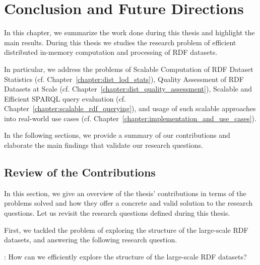 \chapter{Conclusion and Future Directions}
\label{chapter:conclusion}
In this chapter, we summarize the work done during this thesis and highlight the main results.
During this thesis we studies the research problem of efficient distributed in-memory computation and processing of RDF datasets.

In particular, we address the problems of Scalable Computation of RDF Dataset Statistics (cf. Chapter~\ref{chapter:dist_lod_stats}), Quality Assessment of RDF Datasets at Scale (cf. Chapter~\ref{chapter:dist_quality_assessment}), Scalable and Efficient SPARQL query evaluation (cf. Chapter~\ref{chapter:scalable_rdf_querying}), and usage of such scalable approaches into real-world use cases (cf. Chapter~\ref{chapter:implementation_and_use_cases}).

In the following sections, we provide a summary of our contributions and elaborate the main findings that validate our research questions.

\section{Review of the Contributions}
In this section, we give an overview of the thesis' contributions in terms of the problems solved and how they offer a concrete and valid solution to the research questions.
Let us revisit the research questions defined during this thesis.

First, we tackled the problem of exploring the structure of the large-scale RDF datasets, and answering the following research question.

\begin{tcolorbox}
\textbf{\rqNr[RQ1]\label{rqc:1}}: How can we efficiently explore the structure of the large-scale RDF datasets?
\end{tcolorbox}

